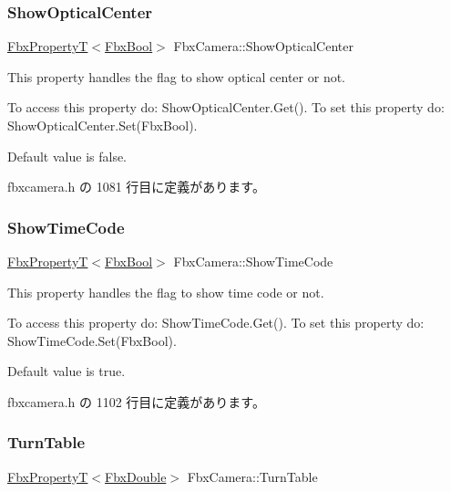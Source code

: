 \subsubsection{\texorpdfstring{Show\+Optical\+Center}{ShowOpticalCenter}}
{\footnotesize\ttfamily \hyperlink{class_fbx_property_t}{Fbx\+PropertyT}$<$\hyperlink{fbxtypes_8h_a92e0562b2fe33e76a242f498b362262e}{Fbx\+Bool}$>$ Fbx\+Camera\+::\+Show\+Optical\+Center}

This property handles the flag to show optical center or not.

To access this property do\+: Show\+Optical\+Center.\+Get(). To set this property do\+: Show\+Optical\+Center.\+Set(\+Fbx\+Bool).

Default value is false. 

 fbxcamera.\+h の 1081 行目に定義があります。

\mbox{\label{class_fbx_camera_a26906a88450a20a23eef13ecec0a4871}} 
\subsubsection{\texorpdfstring{Show\+Time\+Code}{ShowTimeCode}}
{\footnotesize\ttfamily \hyperlink{class_fbx_property_t}{Fbx\+PropertyT}$<$\hyperlink{fbxtypes_8h_a92e0562b2fe33e76a242f498b362262e}{Fbx\+Bool}$>$ Fbx\+Camera\+::\+Show\+Time\+Code}

This property handles the flag to show time code or not.

To access this property do\+: Show\+Time\+Code.\+Get(). To set this property do\+: Show\+Time\+Code.\+Set(\+Fbx\+Bool).

Default value is true. 

 fbxcamera.\+h の 1102 行目に定義があります。

\mbox{\label{class_fbx_camera_a927ab13d2fa91468ecb5373fdffd725a}} 
\subsubsection{\texorpdfstring{Turn\+Table}{TurnTable}}
{\footnotesize\ttfamily \hyperlink{class_fbx_property_t}{Fbx\+PropertyT}$<$\hyperlink{fbxtypes_8h_a171e72a1c46fc15c1a6c9c31948c1c5b}{Fbx\+Double}$>$ Fbx\+Camera\+::\+Turn\+Table}

